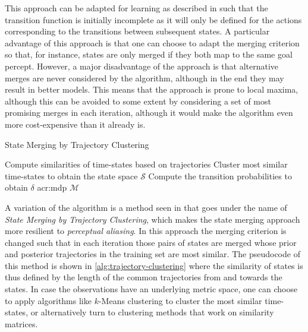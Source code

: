This approach can be adapted for learning  as described in \cite{nikovski1999learning} such that the transition function is initially incomplete as it will only be defined for the actions corresponding to the transitions between subsequent states.
A particular advantage of this approach is that one can choose to adapt the merging criterion so that, for instance, states are only merged if they both map to the same goal percept.
However, a major disadvantage of the approach is that alternative merges are never considered by the algorithm, although in the end they may result in better models.
This means that the approach is prone to local maxima, although this can be avoided to some extent by considering a set of most promising merges in each iteration, although it would make the algorithm even more cost-expensive than it already is.

\begin{algorithm}[t]
	\caption{State Merging by Trajectory Clustering}
	\label{alg:trajectory-clustering}
	\begin{algorithmic}[1]
		 
		\State Compute similarities of time-states based on trajectories
		\State Cluster most similar time-states to obtain the state space $\mathcal{S}$
		\State Compute the transition probabilities to obtain $\delta$
		\State \Return \acrshort{acr:mdp} $\mathcal{M}$
	\end{algorithmic}
\end{algorithm}

A variation of the algorithm is a method seen in \cite{nikovski1999learning} that goes under the name of \textit{State Merging by Trajectory Clustering}, which makes the state merging approach more resilient to \textit{perceptual aliasing}.
In this approach the merging criterion is changed such that in each iteration those pairs of states are merged whose prior and posterior trajectories in the training set are most similar.
The pseudocode of this method is shown in \autoref{alg:trajectory-clustering} where the similarity of states is thus defined by the length of the common trajectories from and towards the states. 
In case the observations have an underlying metric space, one can choose to apply algorithms like $k$-Means clustering to cluster the most similar time-states, or alternatively turn to clustering methods that work on similarity matrices.

